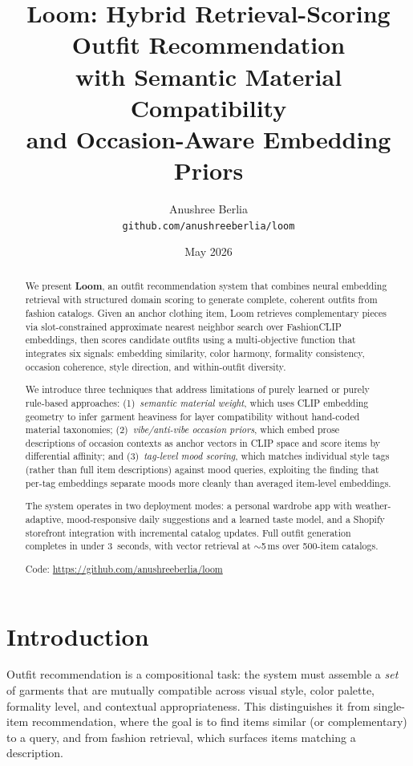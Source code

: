 \documentclass[10pt,twocolumn]{article}
\title{Loom: Hybrid Retrieval-Scoring Outfit Recommendation\\with Semantic Material Compatibility\\and Occasion-Aware Embedding Priors}
\author{
  Anushree Berlia\\
  \texttt{github.com/anushreeberlia/loom}
}
\date{May 2026}
\begin{document}
\maketitle

\begin{abstract}
We present \textbf{Loom}, an outfit recommendation system that combines
neural embedding retrieval with structured domain scoring to generate
complete, coherent outfits from fashion catalogs.  Given an anchor clothing
item, Loom retrieves complementary pieces via slot-constrained approximate
nearest neighbor search over FashionCLIP embeddings, then scores candidate
outfits using a multi-objective function that integrates six signals:
embedding similarity, color harmony, formality consistency, occasion
coherence, style direction, and within-outfit diversity.

We introduce three techniques that address limitations of purely learned
or purely rule-based approaches:
(1)~\emph{semantic material weight}, which uses CLIP embedding geometry to
infer garment heaviness for layer compatibility without hand-coded material
taxonomies;
(2)~\emph{vibe/anti-vibe occasion priors}, which embed prose descriptions of
occasion contexts as anchor vectors in CLIP space and score items by
differential affinity; and
(3)~\emph{tag-level mood scoring}, which matches individual style tags
(rather than full item descriptions) against mood queries, exploiting the
finding that per-tag embeddings separate moods more cleanly than averaged
item-level embeddings.

The system operates in two deployment modes: a personal wardrobe app with
weather-adaptive, mood-responsive daily suggestions and a learned taste
model, and a Shopify storefront integration with incremental catalog updates.
Full outfit generation completes in under 3~seconds, with vector retrieval
at $\sim$5\,ms over 500-item catalogs.

\smallskip\noindent
Code: \url{https://github.com/anushreeberlia/loom}
\end{abstract}

\section{Introduction}
\label{sec:intro}

Outfit recommendation is a compositional task: the system must assemble a
\emph{set} of garments that are mutually compatible across visual style,
color palette, formality level, and contextual appropriateness.  This
distinguishes it from single-item recommendation, where the goal is to find
items similar (or complementary) to a query, and from fashion retrieval,
which surfaces items matching a description.
\end{document}
